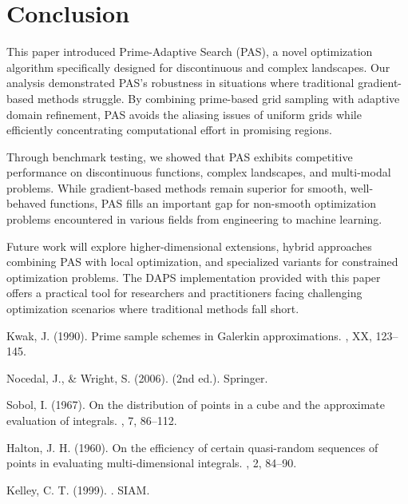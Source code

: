 \documentclass[10pt,twocolumn,letterpaper]{article}
\begin{document}
\section{Conclusion}

This paper introduced Prime-Adaptive Search (PAS), a novel optimization algorithm specifically designed for discontinuous and complex landscapes. Our analysis demonstrated PAS's robustness in situations where traditional gradient-based methods struggle. By combining prime-based grid sampling with adaptive domain refinement, PAS avoids the aliasing issues of uniform grids while efficiently concentrating computational effort in promising regions.

Through benchmark testing, we showed that PAS exhibits competitive performance on discontinuous functions, complex landscapes, and multi-modal problems. While gradient-based methods remain superior for smooth, well-behaved functions, PAS fills an important gap for non-smooth optimization problems encountered in various fields from engineering to machine learning.

Future work will explore higher-dimensional extensions, hybrid approaches combining PAS with local optimization, and specialized variants for constrained optimization problems. The DAPS implementation provided with this paper offers a practical tool for researchers and practitioners facing challenging optimization scenarios where traditional methods fall short.


\begin{thebibliography}{9}
Kwak, J. (1990). 
\newblock Prime sample schemes in Galerkin approximations. 
, XX, 123--145.

Nocedal, J., \& Wright, S. (2006). 
 (2nd ed.). 
\newblock Springer.

Sobol, I. (1967). 
\newblock On the distribution of points in a cube and the approximate evaluation of integrals. 
, 7, 86--112.

Halton, J. H. (1960). 
\newblock On the efficiency of certain quasi-random sequences of points in evaluating multi-dimensional integrals. 
, 2, 84--90.

Kelley, C. T. (1999). 
. 
\newblock SIAM.
\end{thebibliography}
\end{document}
